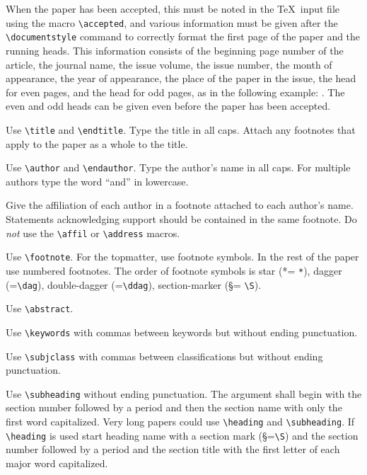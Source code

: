   When the paper has been accepted,
this must be noted in the \TeX\ input file using the macro \verb"\accepted",
and various information must be given
after the \verb"\documentstyle" command to correctly format
the first page of the paper and the running heads.  This information
consists of the beginning page number of the article,
the journal name, the issue volume, the issue number, 
the month of appearance, the year of appearance, 
the place of the paper in the issue, the head for even pages, and
the head for odd pages, as in the following example:
\medskip
\beginverbatim
\accepted
{}
\def\journalname{{\sixrm SIAM J. M{\fiverm ATH.} A{\fiverm NAL.}}}
\def\issuevolume{1}
\def\issuenumber{2}
\def\issuemonth{February}
\def\issueyear{1988}
\def\placenumber{002}
\def\evenhead{bradley j\. lucier and douglas n\. arnold}
\def\oddhead{a sample paper}.
\endverbatim
\medskip
\noindent The even and odd heads can be given even before the paper has been
accepted.

 Use \verb"\title" and \verb"\endtitle".
Type the title in all caps.
Attach any footnotes that apply to the paper
as a whole to the title.

 Use \verb"\author" and \verb"\endauthor".
Type the author's name in all caps.  For multiple authors type the word
``and'' in lowercase.

  Give the  affiliation of each author
in a footnote attached to each author's name.  Statements
acknowledging support should be contained in the same footnote.
Do {\it not} use the \verb"\affil" or \verb"\address" macros.

 Use \verb"\footnote".
For the topmatter, use footnote symbols.
In the rest of the paper
use numbered footnotes. 
The order of footnote symbols is star (*\thinspace = \thinspace\verb"*"), dagger
(\dag\thinspace =\thinspace \verb"\dag"), double-dagger (\ddag\thinspace =\thinspace \verb"\ddag"),
section-marker (\S\thinspace = \thinspace\verb"\S").

 Use \verb"\abstract".

 Use \verb"\keywords" with commas between keywords
but without ending punctuation.

 Use \verb"\subjclass"
with commas between classifications
but without ending punctuation.

 Use \verb"\subheading" without ending punctuation.
The argument shall begin with the section number followed by a period
and then the section name with only the first word capitalized.
Very long papers could use \verb"\heading" and \verb"\subheading".  If
\verb"\heading" is used start heading name with a section mark
(\S\thinspace =\thinspace\verb"\S") and the section number followed by a period and the
section title with the first letter of each major word capitalized.

